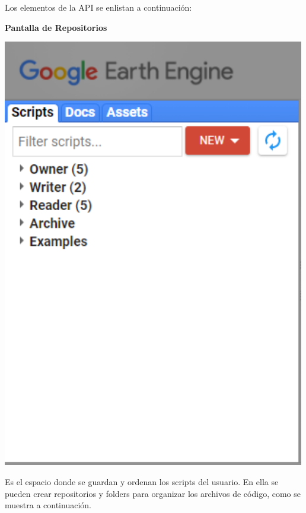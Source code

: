 \documentclass[
]{article}
\begin{document}
Los elementos de la API se enlistan a continuación:

\textbf{Pantalla de Repositorios}

\includegraphics[width=500px]{Img/left_panel}

Es el espacio donde se guardan y ordenan los scripts del usuario. En
ella se pueden crear repositorios y folders para organizar los archivos
de código, como se muestra a continuación.
\end{document}

